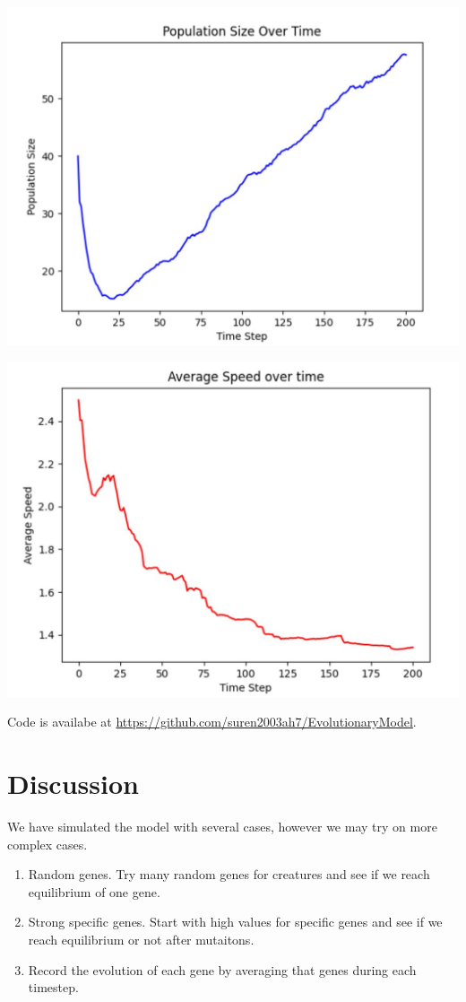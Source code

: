 \documentclass{article}
\begin{document}
\begin{center}
    \includegraphics[scale=0.2]{images/image1.jpg}
\end{center}
\begin{center}
    \includegraphics[scale=0.2]{images/image2.jpg}
\end{center}
Code is availabe at \href{https://github.com/suren2003ah7/EvolutionaryModel}{https://github.com/suren2003ah7/EvolutionaryModel}.
\section{Discussion}
We have simulated the model with several cases, however we may try on more complex cases.

\begin{enumerate}
    \item Random genes. Try many random genes for creatures and see if we reach equilibrium of one gene.
    \item Strong specific genes. Start with high values for specific genes and see if we reach equilibrium or not after mutaitons.
    \item Record the evolution of each gene by averaging that genes during each timestep.
\end{enumerate}
\nocite{*}


\end{document}
